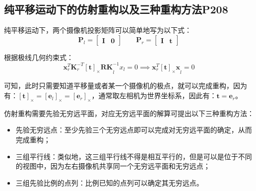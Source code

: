 \documentclass[11pt]{article}
\begin{document}
\subsection{纯平移运动下的仿射重构以及三种重构方法P208}
纯平移运动下，两个摄像机投影矩阵可以简单地写为以下式：
\begin{equation*}
  \mathbf{P}_l=\begin{bmatrix}
    \mathbf{I} & \mathbf{0}
  \end{bmatrix}\qquad\mathbf{P}_r=\begin{bmatrix}
    \mathbf{I} & \mathbf{t}
  \end{bmatrix}
\end{equation*}\par
根据极线几何约束式：
\begin{equation*}
  \mathbf{x}_r^T\mathbf{K}_r^{-T}\mathbf{[t]_\times RK}_l^{-1}x_l=0\implies\mathbf{x}_r^T\mathbf{[t]_\times x}_l=0
\end{equation*}\par
可知，此时只需要知道平移量或者某一个摄像机的极点，就可以完成重构，因为有：$\mathbf{[t]_\times=[e_\mathit{l}]_\times=[e_\mathit{r}]_\times}$，通常取左相机为世界坐标系，因此有：$\mathbf{t=e}_\mathit{r}$。\par
仿射重构需要先验无穷远平面，对应无穷远平面的解算可提出以下三种重构方法：
\begin{itemize}
  \item 先验无穷远点：至少先验三个无穷远点即可以完成对无穷远平面的确定，从而完成重构；
  \item 三组平行线：类似地，这三组平行线不得是相互平行的，但是可以是位于不同的视图中，因为左右摄像机共享同一个无穷远平面和无穷远点；
  \item 三组先验比例的点列：比例已知的点列可以确定其无穷远点。
\end{itemize}
\end{document}
